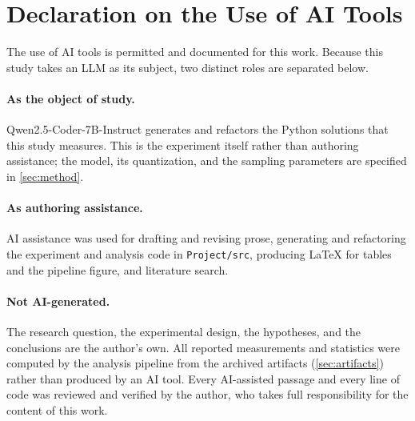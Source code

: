 
\section*{Declaration on the Use of AI Tools}

The use of AI tools is permitted and documented for this work. Because this study
takes an LLM as its subject, two distinct roles are separated below.

\paragraph{As the object of study.} Qwen2.5-Coder-7B-Instruct generates and
refactors the Python solutions that this study measures. This is the experiment
itself rather than authoring assistance; the model, its quantization, and the
sampling parameters are specified in \cref{sec:method}.

\paragraph{As authoring assistance.} AI assistance was used for drafting and
revising prose, generating and refactoring the experiment and analysis code in
\texttt{Project/src}, producing \LaTeX{} for tables and the pipeline figure, and
literature search.

\paragraph{Not AI-generated.} The research question, the experimental design, the
hypotheses, and the conclusions are the author's own. All reported measurements
and statistics were computed by the analysis pipeline from the archived artifacts
(\cref{sec:artifacts}) rather than produced by an AI tool. Every AI-assisted
passage and every line of code was reviewed and verified by the author, who takes
full responsibility for the content of this work.
